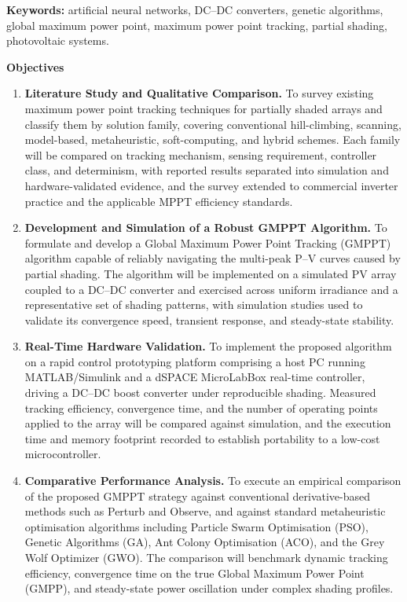 \documentclass[10pt,a4paper]{article}
\begin{document}
\vspace{1em}
\noindent
\textbf{Keywords:} artificial neural networks, DC--DC converters, genetic
algorithms, global maximum power point, maximum power point tracking, partial
shading, photovoltaic systems.

\vspace{1.5em}

\begin{center}
{\large\bfseries Objectives}
\end{center}

\begin{enumerate}
\setlength{\itemsep}{6pt}
\setlength{\parskip}{0pt}

\item \textbf{Literature Study and Qualitative Comparison.}
To survey existing maximum power point tracking techniques for partially shaded
arrays and classify them by solution family, covering conventional
hill-climbing, scanning, model-based, metaheuristic, soft-computing, and hybrid
schemes. Each family will be compared on tracking mechanism, sensing
requirement, controller class, and determinism, with reported results separated
into simulation and hardware-validated evidence, and the survey extended to
commercial inverter practice and the applicable MPPT efficiency standards.

\item \textbf{Development and Simulation of a Robust GMPPT Algorithm.}
To formulate and develop a Global Maximum Power Point Tracking (GMPPT)
algorithm capable of reliably navigating the multi-peak P--V curves caused by
partial shading. The algorithm will be implemented on a simulated PV array
coupled to a DC--DC converter and exercised across uniform irradiance and a
representative set of shading patterns, with simulation studies used to
validate its convergence speed, transient response, and steady-state stability.

\item \textbf{Real-Time Hardware Validation.}
To implement the proposed algorithm on a rapid control prototyping platform
comprising a host PC running MATLAB/Simulink and a dSPACE MicroLabBox
real-time controller, driving a DC--DC boost converter under reproducible
shading. Measured tracking efficiency, convergence time, and the number of
operating points applied to the array will be compared against simulation, and
the execution time and memory footprint recorded to establish portability to a
low-cost microcontroller.

\item \textbf{Comparative Performance Analysis.}
To execute an empirical comparison of the proposed GMPPT strategy against
conventional derivative-based methods such as Perturb and Observe, and against
standard metaheuristic optimisation algorithms including Particle Swarm
Optimisation (PSO), Genetic Algorithms (GA), Ant Colony Optimisation (ACO), and
the Grey Wolf Optimizer (GWO). The comparison will benchmark dynamic tracking
efficiency, convergence time on the true Global Maximum Power Point (GMPP), and
steady-state power oscillation under complex shading profiles.

\end{enumerate}
\end{document}
